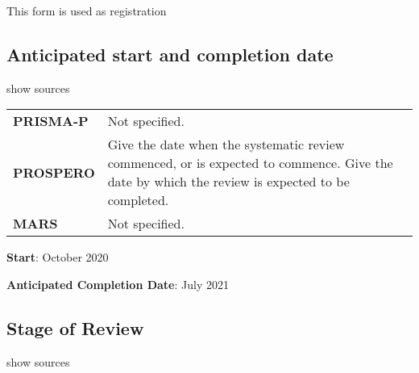 \documentclass[
]{article}
\begin{document}
This form is used as registration

\hypertarget{anticipated-start-and-completion-date}{%
\subsection{Anticipated start and completion
date}\label{anticipated-start-and-completion-date}}

show sources

\hypertarget{aasd}{}
\begin{collapse}

\begin{table}[H]
\centering
\begin{tabular}{>{}l|l}
\hline
\cellcolor[HTML]{ececec}{source} & \cellcolor[HTML]{ececec}{description}\\
\hline
\textbf{PRISMA-P} & Not specified.\\
\hline
\textbf{PROSPERO} & Give the date when the systematic review commenced, or is expected to commence. Give the date by which the review is expected to be completed.\\
\hline
\textbf{MARS} & Not specified.\\
\hline
\end{tabular}
\end{table}

\end{collapse}

\textbf{Start}: October 2020

\textbf{Anticipated Completion Date}: July 2021

\hypertarget{stage-of-review}{%
\subsection{Stage of Review}\label{stage-of-review}}

show sources
\end{document}
